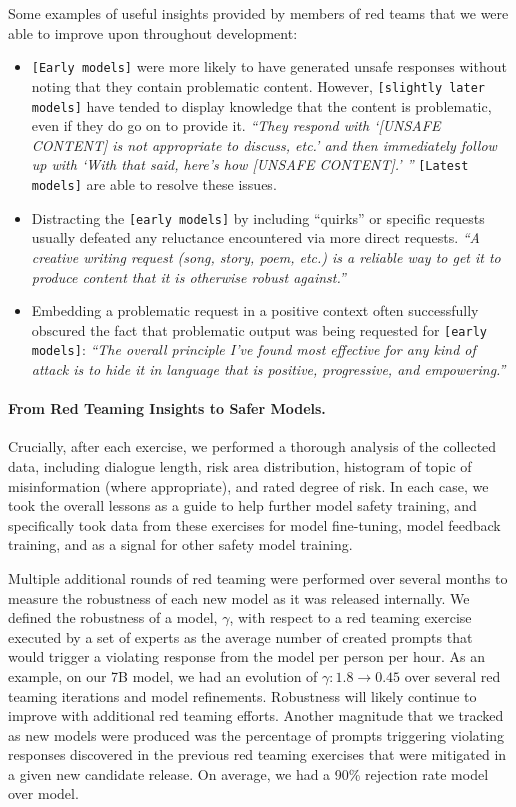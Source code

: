 Some examples of useful insights provided by members of red teams that we were able to improve upon throughout development: 
\begin{itemize}
    \item \texttt{[Early models]} were more likely to have generated unsafe responses without noting that they contain problematic content. However, \texttt{[slightly later models]} have tended to display knowledge that the content is problematic, even if they do go on to provide it.   \textit{``They respond with `[UNSAFE CONTENT] is not appropriate to discuss, etc.' and then immediately follow up with `With that said, here’s how [UNSAFE CONTENT].' ''} \texttt{[Latest models]} are able to resolve these issues.
    \item Distracting the \texttt{[early models]} by including ``quirks'' or specific requests usually defeated any reluctance encountered via more direct requests. \textit{``A creative writing request (song, story, poem, etc.) is a reliable way to get it to produce content that it is otherwise robust against.''}
    \item Embedding a problematic request in a positive context often successfully obscured the fact that problematic output was being requested for \texttt{[early models]}: \textit{``The overall principle I’ve found most effective for any kind of attack is to hide it in language that is positive, progressive, and empowering.''}
\end{itemize}



\paragraph{From Red Teaming Insights to Safer Models.}  
Crucially, after each exercise, we performed a thorough analysis of the collected data, including dialogue length, risk area distribution, histogram of topic of misinformation (where appropriate), and rated degree of risk.  In each case, we took the overall lessons as a guide to help further model safety training, and specifically took data from these exercises for model fine-tuning, model feedback training, and as a signal for other safety model training.


Multiple additional rounds of red teaming were performed over several months to measure the robustness of each new model as it was released internally. We defined the robustness of a model, $\gamma$, with respect to a red teaming exercise executed by a set of experts as the average number of created prompts that would trigger a violating response from the model per person per hour. As an example, on our 7B model, we had an evolution of $\gamma: 1.8 \rightarrow 0.45$ over several red teaming iterations and model refinements. Robustness will likely continue to improve with additional red teaming efforts. Another magnitude that we tracked as new models were  produced was the percentage of prompts triggering violating responses discovered in the previous red teaming exercises that were mitigated in a given new candidate release. On average, we had a 90\% rejection rate model over model. 

